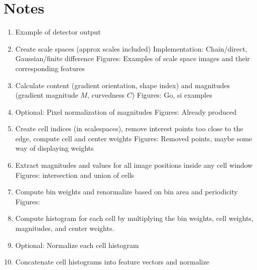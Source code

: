 \documentclass[thesis.tex]{subfiles}
\begin{document}
\section{Notes}
%
%
\begin{enumerate}
\item Example of detector output
\item Create scale spaces (approx scales included)
	Implementation: Chain/direct, Gaussian/finite difference
	Figures: Examples of scale space images and their corresponding features
\item Calculate content (gradient orientation, shape index) and magnitudes (gradient magnitude $M$, curvedness $C$)
	Figures: Go, si examples
\item Optional: Pixel normalization of magnitudes
	Figures: Already produced
\item Create cell indices (in scalespaces), remove interest points too close to the edge, compute cell and center weights
	Figures: Removed points, maybe some way of displaying weights
\item Extract magnitudes and values for all image positions inside any cell window
	Figures: intersection and union of cells
\item Compute bin weights and renormalize based on bin area and periodicity
	Figures: 
\item Compute histogram for each cell by multiplying the bin weights, cell weights, magnitudes, and center weights.
\item Optional: Normalize each cell histogram
\item Concatenate cell histograms into feature vectors and normalize
\end{enumerate}
%
\end{document}

